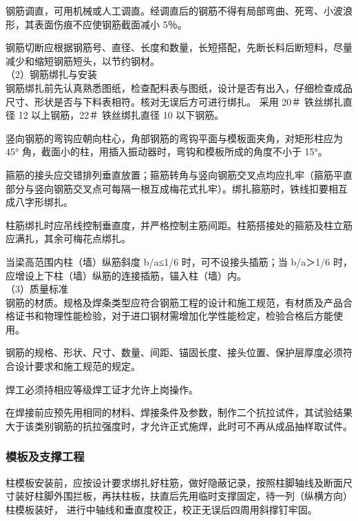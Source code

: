  钢筋调直，可用机械或人工调直。经调直后的钢筋不得有局部弯曲、死弯、小波浪形，其表面伤痕不应使钢筋截面减小 5％。

 钢筋切断应根据钢筋号、直径、长度和数量，长短搭配，先断长料后断短料，尽量减少和缩短钢筋短头，以节约钢材。\\


（2）钢筋绑扎与安装\\

钢筋绑扎前先认真熟悉图纸，检查配料表与图纸，设计是否有出入，仔细检查成品尺寸、形状是否与下料表相符。核对无误后方可进行绑扎。
采用 20＃ 铁丝绑扎直径 12 以上钢筋，22＃ 铁丝绑扎直径 10 以下钢筋。

 竖向钢筋的弯钩应朝向柱心，角部钢筋的弯钩平面与模板面夹角，对矩形柱应为 45° 角，截面小的柱，用插入振动器时，弯钩和模板所成的角度不小于 15°。

 箍筋的接头应交错排列垂直放置；箍筋转角与竖向钢筋交叉点均应扎牢（箍筋平直部分与竖向钢筋交叉点可每隔一根互成梅花式扎牢）。绑扎箍筋时，铁线扣要相互成八字形绑扎。

 柱筋绑扎时应吊线控制垂直度，并严格控制主筋间距。柱筋搭接处的箍筋及柱立筋应满扎，其余可梅花点绑扎。

 当梁高范围内柱（墙）纵筋斜度 b/a≤1/6 时，可不设接头插筋；当 b/a＞1/6 时，应增设上下柱（墙）纵筋的连接插筋，锚入柱（墙）内。 \\

（3）质量标准\\

 钢筋的材质。规格及焊条类型应符合钢筋工程的设计和施工规范，有材质及产品合格证书和物理性能检验，对于进口钢材需增加化学性能检定，检验合格后方能使用。

 钢筋的规格、形状、尺寸、数量、间距、锚固长度、接头位置、保护层厚度必须符合设计要求和施工规范的规定。

 焊工必须持相应等级焊工证才允许上岗操作。

 在焊接前应预先用相同的材料、焊接条件及参数，制作二个抗拉试件，其试验结果大于该类别钢筋的抗拉强度时，才允许正式施焊，此时可不再从成品抽样取试件。


\subsubsection{模板及支撑工程}

柱模板安装前，应按设计要求绑扎好柱筋，做好隐蔽记录，按照柱脚轴线及断面尺寸装好柱脚外围拦板，再扶柱板，扶直后先用临时支撑固定，待一列（纵横方向）柱模板装好，
进行中轴线和垂直度校正，校正无误后四周用斜撑钉牢固。

